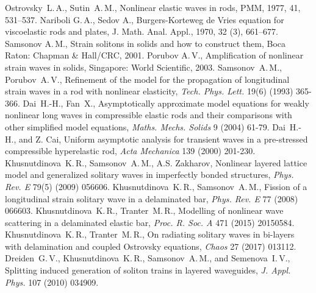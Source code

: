 \documentclass[12pt, a4paper]{article}
\begin{document}
\begin{thebibliography}{99}

	 Ostrovsky~L.\,A., Sutin~A.\,M., Nonlinear elastic waves in rods, PMM, 1977, 41, 531--537.
	 Nariboli G.\,A., Sedov A., Burgers-Korteweg de Vries equation for viscoelastic rods and plates, J. Math. Anal. Appl., 1970, 32 (3), 661--677.
	 Samsonov A.\,M., Strain solitons in solids and how to construct them, Boca Raton: Chapman \& Hall/CRC, 2001.
	 Porubov A.\,V., Amplification of nonlinear strain waves in solids, Singapore: World Scientific, 2003.	
	 Samsonov~A.\,M., Porubov~A.\,V., Refinement of the model for the propagation of longitudinal strain waves in a rod with nonlinear elasticity, \textit{Tech. Phys. Lett.} 19(6) (1993) 365-366.
	 Dai~H.-H., Fan~X., Asymptotically approximate model equations for weakly nonlinear long waves in compressible elastic rods and their comparisons with other simplified model equations, \textit{Maths. Mechs. Solids} 9 (2004) 61-79.
	 Dai~H.-H., and Z. Cai, Uniform asymptotic analysis for transient waves in a pre-stressed compressible hyperelastic rod, \textit{Acta Mechanica} 139 (2000) 201-230.
	 Khusnutdinova~K.\,R., Samsonov~A.\,M., A.S. Zakharov, Nonlinear layered lattice model and generalized solitary waves in imperfectly bonded structures, \textit{Phys. Rev. E} 79(5) (2009) 056606.
	 Khusnutdinova~K.\,R., Samsonov~A.\,M., Fission of a longitudinal strain solitary wave in a delaminated bar, \textit{Phys. Rev. E} 77 (2008) 066603.
	 Khusnutdinova~K.\,R., Tranter~M.\,R., Modelling of nonlinear wave scattering in a delaminated elastic bar, \textit{Proc. R. Soc. A} 471 (2015) 20150584.
	 Khusnutdinova~K.\,R., Tranter~M.\,R., On radiating solitary waves in bi-layers with delamination and coupled Ostrovsky equations, \textit{Chaos} 27 (2017) 013112.
	 Dreiden~G.\,V., Khusnutdinova~K.\,R., Samsonov~A.\,M., and Semenova~I.\,V., Splitting induced generation of soliton trains in layered waveguides, \textit{J. Appl. Phys.} 107 (2010) 034909.

\end{thebibliography}
\end{document}
